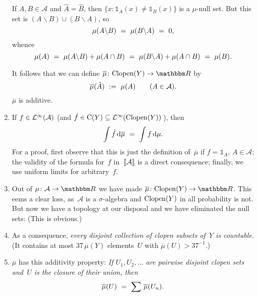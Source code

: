 \documentclass[main.tex]{subfiles}
\begin{document}
\begin{psec}{6.20}
\begin{enumerate}
If $A,B\in \mathcal A$ and $\hat A=\hat B$,
then $\{x\colon \mathbb{1}_A(x)\neq\mathbb{1}_B(x)\}$
is a $\mu$-null set.
But this set is $(A\backslash B)\cup(B\backslash A)$,
so
\begin{equation*}
\mu(A\backslash B)\ =\ \mu(B\backslash A)\ =\ 0\text{,}
\end{equation*}
whence
\begin{equation*}
\mu(A)\ =\ \mu(A\backslash B) + \mu(A\cap B)
\ =\ \mu(B\backslash A) + \mu(A\cap B)
\ =\ \mu(B)\htam{.}
\end{equation*}

It follows that we can define
$\overline \mu\colon \clopen(Y)\ra \R$ by
\begin{equation*}
\overline{\mu} (\hat A)\ :=\ \mu(A)\qquad (A\in\mathcal A)\text{.}
\end{equation*}
$\overline \mu$ is additive.
%
\item\label{6.20-4}
If $f\in\mathcal{L}^\infty(\mathcal A)$
(and $\hat f\in\mathrm{C}(Y)\subseteq \mathcal{L}^\infty(\mathrm{Clopen}(Y))$\,), then
\begin{equation*}
\int \hat{f}\,\mathrm{d}\overline{\mu}\ =\ \int f\,\mathrm{d}\mu\text{.}
\end{equation*}
For a proof,
first observe that this is just the definition of~$\overline \mu$
if $f=\mathbb{1}_A$, $A\in\mathcal A$;
the validity of the formula for~$f$ in~$\lbb\mathcal A\rbb$
is a direct consequence;
finally, we use uniform limits for arbitrary~$f$.
%
\item\label{6.20-5}
Out of $\mu\colon\mathcal A\ra \R$
we have made $\overline\mu\colon\clopen(Y)\ra\R$.
This eems a clear loss,
as~$\mathcal A$ is a $\sigma$-algebra
and $\mathrm{Clopen}(Y)$
in all probability is not.
But now we have a topology at our disposal
and we have eliminated the null sets:
(This is obvious.)
%
\item\label{6.20-6}
As a consequence,
\emph{every disjoint collection of clopen subsets of~$Y$
is countable.}
(It contains at most $37\,\overline{\mu}(Y)$ elements~$U$
with $\overline \mu(U)>37^{-1}$.)
%
\item\label{6.20-7}
$\overline\mu$ has this additivity property:
\emph{If $U_1,U_2,\dotsc$ are pairwise disjoint
clopen sets and~$U$ is the closure of their union,
then
\begin{equation*}
\overline\mu(U)\ =\ \sum\,\overline\mu(U_n)\htam{.}

\end{equation*}}
\end{enumerate}
\end{psec}
\end{document}
